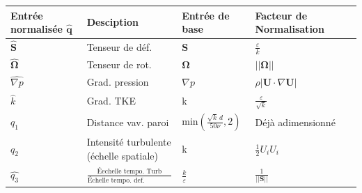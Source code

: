 \documentclass[a4paper,12pt]{report}
\newcommand{\bepar}[1]{
	\left( #1 \right)  
}
\newcommand{\norm}[1]{
	\left \vert \left \vert #1 \right \vert  \right \vert
}
\numberwithin{equation}{section} %
\begin{document}
\begin{table}[!ht]
\centering
	\begin{tabular}{M{0.15\textwidth}| M{.3\textwidth} M{0.18\textwidth} M{0.3\textwidth} N}
	\hline
	Entrée normalisée $\hat{\textbf{q}}$ & Desciption & Entrée de base & Facteur de Normalisation &\\[8mm]\hline
	$\hat{\textbf{S}}$ & Tenseur de déf. & \textbf{S} &$ \displaystyle\frac{\varepsilon}{k}$ &\\[5mm] \hline
	$\hat{\mathbf{\Omega}}$ & Tenseur de rot. & $\mathbf{\Omega}$  &$ \norm{\mathbf{\Omega}}$ &\\[5mm] \hline
	$\widehat{\nabla p}$ & Grad. pression & $\nabla p$  &$ \rho \left \vert \textbf{U} \cdot \nabla \textbf{U} \right \vert$ &\\[5mm] \hline
	$\widehat{k}$ & Grad. TKE & k &$ \displaystyle\frac{\varepsilon}{\sqrt{k}}$ &\\[5mm] \hline
	$q_1$ & Distance vav. paroi & $\displaystyle \text{min}\bepar{\frac{\sqrt{k}\, d}{50 \nu}, 2}$  & Déjà adimensionné &\\[12mm] \hline
	$q_2$ & Intensité turbulente (échelle spatiale) & k &$ \displaystyle\frac{1}{2}U_i U_i$ &\\[12mm] \hline
	$\widehat{q_3}$ & $\displaystyle \frac{\text{Éechelle tempo. Turb}}{\text{Échelle tempo. def. moyenne}}$  & $\displaystyle \frac{k}{\varepsilon}$  &$ \displaystyle \frac{1}{\norm{\textbf{S}}}$ &\\[12mm] \hline
	\end{tabular}
\end{table}

\pagebreak

\subsection*{\cite{kaandorp2018stochastic}}

\pagebreak



\end{document}
